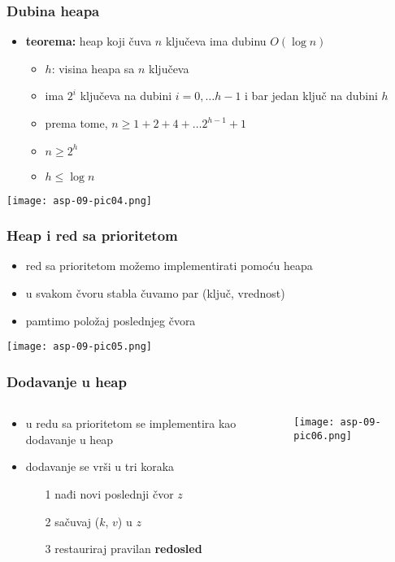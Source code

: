 \documentclass[compress]{beamer}
\begin{document}
\begin{frame}[fragile]
  \frametitle{Dubina heapa}
  \begin{itemize}
    \item \textbf{teorema:} heap koji čuva $n$ ključeva ima dubinu $O(\log n)$
    \begin{itemize}
      \item $h$: visina heapa sa $n$ ključeva
      \item ima $2^i$ ključeva na dubini $i = 0, \ldots h-1$ i bar jedan ključ
      na dubini $h$
      \item prema tome, $n \geq 1 + 2 + 4 + \ldots 2^{h-1} + 1$
      \item $n \geq 2^h$
      \item $h \leq \log n$
    \end{itemize}
  \end{itemize}
  \begin{center}
    \texttt{[image: asp-09-pic04.png]}
  \end{center}
\end{frame}

\begin{frame}[fragile]
  \frametitle{Heap i red sa prioritetom}
  \begin{itemize}
    \item red sa prioritetom možemo implementirati pomoću heapa
    \item u svakom čvoru stabla čuvamo par (ključ, vrednost)
    \item pamtimo položaj poslednjeg čvora
  \end{itemize}
  \begin{center}
    \texttt{[image: asp-09-pic05.png]}
  \end{center}
\end{frame}

\begin{frame}[fragile]
  \frametitle{Dodavanje u heap}
  \begin{columns}
    \begin{column}[c]{6cm}
      \begin{itemize}
        \item {} u redu sa prioritetom se implementira kao dodavanje
        u heap
        \item dodavanje se vrši u tri koraka
        \begin{itemize}
          \item[1] nađi novi poslednji čvor $z$
          \item[2] sačuvaj ($k$, $v$) u $z$
          \item[3] restauriraj pravilan \textbf{redosled}
        \end{itemize}
      \end{itemize}
    \end{column}
    \begin{column}[c]{5cm}
      \begin{center}
        \texttt{[image: asp-09-pic06.png]}
      \end{center}
    \end{column}
  \end{columns}
\end{frame}
\end{document}
